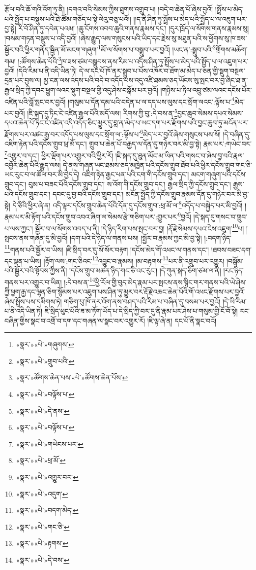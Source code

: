 རྩོལ་བའི་ཆོ་གའི་འོག་ཏུ་ནི། །དགའ་བའི་སེམས་ཀྱིས་ཐུགས་འགྲུབ་པ། །བདེ་བ་ཆེན་པོ་ཞེས་བྱའོ། །སྤྲོས་པ་མེད་པའི་སྤྱོད་པ་བསྡུས་པའི་ཐེ་ཚོམ་གཅོད་པ་སྟེ་ལེའུ་བཅུ་པའོ།། །།ད་ནི་ཤིན་ཏུ་སྤྲོས་པ་མེད་པའི་སྤྱོད་པ་ལ་འཇུག་པར་བྱ་སྟེ། རི་བོ་ཤིན་ཏུ་དབེན་པའམ། །ཆུ་ངོགས་འབབ་ཆུའི་གནས་རྣམས་དང་། །དུར་ཁྲོད་ལ་སོགས་གནས་རྣམས་སུ། །བསམ་གཏན་བསྡུས་པ་འདི་བྱའོ། །ཞེས་རྒྱུད་ལས་གསུངས་པའི་ཡིད་དང་རྗེས་སུ་མཐུན་པའི་ས་ཕྱོགས་སུ་ཁ་ཟས་སྦྱོར་བའི་ཕྱིར་གནོད་སྦྱིན་མོ་མངག་གཞུག་\footnote{«སྣར་»«པེ་»གཞུགས་}མོ་ལ་སོགས་པ་བསྒྲུབ་པར་བྱའོ། །ཡང་ན་:སྒྲུབ་པའི་\footnote{«སྣར་»«པེ་»གྲུབ་པའི་}གྲོགས་མཆོག་གམ། །:ཚོགས་ཆེན་པོའི་\footnote{«སྣར་»ཚོགས་ཆེན་པས་«པེ་»ཚོགས་ཆེན་པོས་}ཁ་ཟས་ཙམ་བསྒྲུབས་ནས་རིམ་པ་འདིས་ཤིན་ཏུ་སྤྲོས་པ་མེད་པའི་སྤྱོད་པ་ལ་འཇུག་པར་བྱའོ། །དེའི་རིམ་པ་ནི་འདི་ཡིན་ཏེ། དེ་ལ་དང་པོ་ཁོ་ནར་སྒྲུབ་པ་པོས་འཁོར་བ་ཐོག་མ་མེད་པ་ཅན་གྱི་སྡུག་བསྔལ་དྲན་པར་བྱས་ལ། མྱ་ངན་ལས་འདས་པའི་བདེ་བ་འདོད་པས་འདུ་འཛི་ཐམས་ཅད་ཡོངས་སུ་སྤང་བར་བྱ་ཞིང་ཐ་ན་རྒྱལ་སྲིད་ཀྱི་དབང་ཕྱུག་ལའང་སྡུག་བསྔལ་གྱི་འདུ་ཤེས་བསྒོམ་པར་བྱའོ། །གཉིས་པ་ཏིལ་འབྲུ་ཙམ་ལའང་དངོས་པོར་འཛིན་པའི་བློ་སྤང་བར་བྱའོ། །གསུམ་པ་དོན་དམ་པའི་བདེན་པ་ལ་དད་པས་ལུས་དང་སྲོག་ལའང་:ལྟོས་པ་\footnote{«སྣར་»«པེ་»བལྟོས་པ་}མེད་པར་བྱའོ། །ཇི་སྐད་དུ་ཏིང་ངེ་འཛིན་རྒྱལ་པོའི་མདོ་ལས། རིགས་ཀྱི་བུ་:དེ་བས་ན་\footnote{«སྣར་»«པེ་»དེ་ནས་}བྱང་ཆུབ་སེམས་དཔའ་སེམས་དཔའ་ཆེན་པོ་ཏིང་ངེ་འཛིན་འདི་འདོད་ཅིང་མྱུར་དུ་བླ་ན་མེད་པ་ཡང་དག་པར་རྫོགས་པའི་བྱང་ཆུབ་ཏུ་མངོན་པར་རྫོགས་པར་འཚང་རྒྱ་བར་འདོད་པས་ལུས་དང་སྲོག་ལ་:ལྟོས་པ་\footnote{«སྣར་»«པེ་»བལྟོས་པ་}མེད་པར་བྱའོ་ཞེས་གསུངས་པས་སོ། །དེ་བཞིན་དུ་འཇིག་རྟེན་པའི་དངོས་གྲུབ་ཕྲ་མོ་དང་། གྲུབ་པ་ཆེན་པོ་བརྒྱད་ལ་དོན་དུ་གཉེར་བར་མི་བྱ་སྟེ། རྣམ་པར་:གཡེང་བར་\footnote{«སྣར་»«པེ་»གཡེངས་པར་}འགྱུར་བ་དང་། ཕྱིར་ལྡོག་པར་འགྱུར་བའི་ཕྱིར་རོ། །ཇི་སྐད་དུ་ཐུན་མོང་མ་ཡིན་པའི་གསང་བ་ཞེས་བྱ་བའི་རྣལ་འབྱོར་ཆེན་པོའི་རྒྱུད་ལས། དེ་ནས་གཞན་ཡང་ཐམས་ཅད་མཁྱེན་པའི་དངོས་གྲུབ་ཐོབ་པའི་ཕྱིར་དངོས་གྲུབ་གང་ཅི་ཡང་རུང་བ་ལ་ཚོལ་བར་མི་བྱེད་དེ། འཇིག་རྟེན་རྒྱང་པན་པའི་ངག་གི་དངོས་གྲུབ་དང་། མངག་གཞུག་པའི་དངོས་གྲུབ་དང་། བུམ་པ་བཟང་པོའི་དངོས་གྲུབ་དང་། ས་འོག་གི་དངོས་གྲུབ་དང་། རྒྱལ་སྲིད་ཀྱི་དངོས་གྲུབ་དང་། རྒྱས་པའི་དངོས་གྲུབ་དང་། དབང་དུ་བྱ་བའི་དངོས་གྲུབ་དང་། མངོན་སྤྱོད་ཀྱི་དངོས་གྲུབ་རྣམས་དོན་དུ་གཉེར་བར་མི་བྱ་སྟེ། དེ་ཅིའི་ཕྱིར་ཞེ་ན། འདི་ལྟར་དངོས་གྲུབ་ཆེན་པོའི་དོན་དུ་དངོས་གྲུབ་:ཕྲ་མོ་ལ་\footnote{«སྣར་»«པེ་»ཕྲ་མོ་}འདོད་པ་བསྐྱེད་པར་མི་བྱའོ། །རྣམ་པར་མི་རྟོག་པའི་དངོས་གྲུབ་འབའ་ཞིག་ལ་སེམས་རྩེ་གཅིག་པར་:གྱུར་པར་\footnote{«སྣར་»«པེ་»འགྱུར་བར་}བྱའོ། །དེ་སྐད་དུ་གསང་བ་གྲུབ་པ་ལས་ཀྱང་། སྦྱོར་བ་ལ་སོགས་འབད་པ་ནི། །དེ་ཉིད་རིག་པས་སྤང་བར་བྱ། །རྡོ་རྗེ་སེམས་དཔའ་ངེས་འཇུག་\footnote{«སྣར་»«པེ་»འདུག་}པ། །སྤངས་ནས་གཞན་དུ་མི་བྱའོ། །དག་པའི་དེ་ཉིད་ལ་གནས་པས། །སྦྱོར་བ་རྣམས་ཀྱང་མི་བྱ་སྟེ། །:བདག་ཉིད་\footnote{«སྣར་»«པེ་»བདག་མེད་}གནས་པའི་སྦྱོར་བ་ཡིས། །ཇི་སྲིད་བར་དུ་སོ་སོར་བརྟག །དངོས་མེད་གོ་འཕང་ལ་གནས་དང་། །ཐབས་བཟང་དག་དང་ལྡན་པ་ཡིས། །རྟོག་ལས་:གང་ཅིའང་\footnote{«སྣར་»«པེ་»གང་ཅི་}འབྱུང་བ་རྣམས། །མ་བརྟགས་\footnote{«སྣར་»«པེ་»རྟགས་}པར་ནི་འགྲུབ་པར་འགྱུར། །བསྒོམ་པའི་སྦྱོར་བའི་སྟོབས་ཀྱིས་ནི། །དངོས་གྲུབ་མཚན་ཉིད་གང་ཅི་འང་རུང་། །དེ་ཀུན་སྐད་ཅིག་ཙམ་ལ་ནི། །རང་ཉིད་གནས་པར་འགྱུར་བ་ཡིན། །:དེ་བས་ན་\footnote{«སྣར་»«པེ་»དེ་བས་}ཕྱི་རོལ་གྱི་བུད་མེད་རྣམ་པར་སྤངས་ནས་སྙིང་གར་གནས་པའི་ཡེ་ཤེས་ཀྱི་ཕྱག་རྒྱ་དང་ལྷན་ཅིག་སྙོམས་པར་འཇུག་པས་ཤིན་ཏུ་མྱུར་བར་རྡོ་རྗེ་འཆང་ཆེན་པོའི་གོ་འཕང་རྫོགས་པར་བྱའོ་ཞེས་སྤྲོས་པས་དམིགས་ཏེ། གཅིག་པུ་ཁོ་ནར་འོག་ནས་བཤད་པའི་རིམ་པ་བཞིན་དུ་བསམ་པར་བྱའོ། །དེ་ཡི་རིམ་པ་ནི་འདི་ཡིན་ཏེ། ཇི་སྲིད་ཕུང་པོའི་ཟ་མ་ཏོག་ཡོད་པ་དེ་སྲིད་ཀྱི་བར་དུ་ནི་རྣམ་པར་ཤེས་པ་གསུམ་གྱི་ངོ་བོ་སྟེ། རང་བཞིན་གྱིས་སྣང་བ་འགྲོ་བ་དག་དང་གཞན་ལ་སྣང་བར་འགྱུར་རོ། །ཇི་ལྟ་ཞེ་ན། དང་པོ་ནི་སྣང་བའོ། 